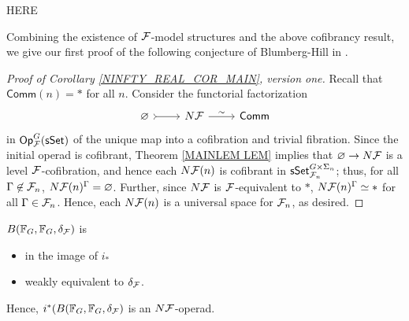 \documentclass[a4paper,10pt]{article}%
\begin{document}


{\color{red} HERE}

Combining the existence of $\mathcal F$-model structures and the above cofibrancy result, we give our first proof of the following conjecture of Blumberg-Hill  in \cite{BH15}.


\begin{proof}[Proof of Corollary \ref{NINFTY_REAL_COR_MAIN}, version one]
  Recall that $\mathsf{Comm}(n) = *$ for all $n$. Consider the functorial factorization 
  \[
  \begin{tikzcd}
    \varnothing \arrow[r, rightarrowtail] & N\F \arrow[r, "\sim"] & \mathsf{Comm}
  \end{tikzcd}
  \]
  in $\mathsf{Op}^{G}_{\mathcal F}(\mathsf{sSet})$ of the unique map into a cofibration and trivial fibration. Since the initial operad is cofibrant, Theorem \ref{MAINLEM LEM} implies that $\varnothing \to N\mathcal F$ is a level $\mathcal F$-cofibration, and hence each $N\mathcal F(n)$ is cofibrant in $\mathsf{sSet}^{G\times \Sigma_n}_{\mathcal F_n}$; thus, for all $\Gamma \not\in\mathcal F_n$, $N\mathcal F(n)^\Gamma = \varnothing$. Further, since $N\mathcal F$ is $\mathcal F$-equivalent to $*$, $N\mathcal F(n)^\Gamma \simeq *$ for all $\Gamma \in \mathcal F_n$. Hence, each $N\mathcal F(n)$ is a universal space for $\mathcal F_n$, as desired.
\end{proof}

\begin{theorem}
  \label{N_INFINITY_BAR}
  $B(\mathbb F_G, \mathbb F_G, \delta_{\mathcal F})$ is 
  \begin{itemize}
  \item in the image of $i_*$
  \item weakly equivalent to $\delta_{\mathcal F}$.
  \end{itemize}
  Hence, $i^*(B(\mathbb F_G, \mathbb F_G, \delta_{\mathcal F})$ is an $N\mathcal F$-operad.
\end{theorem}
\end{document}
